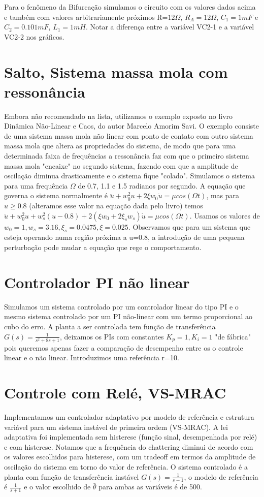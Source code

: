 \documentclass[11pt]{report}
\begin{document}
Para o fenômeno da Bifurcação simulamos o circuito com os valores dados acima e também com valores arbitrariamente próximos R=$12\Omega$, $R_A=12\Omega$, $C_1=1mF$ e $C_2=0.101mF$, $L_1=1mH$. Notar a diferença entre a variável VC2-1 e a variável VC2-2 nos gráficos.


\section{Salto, Sistema massa mola com ressonância}
Embora não recomendado na lista, utilizamos o exemplo exposto no livro Dinâmica Não-Linear e Caos, do autor Marcelo Amorim Savi. O exemplo consiste de uma sistema massa mola não linear com ponto de contato com outro sistema massa mola que altera as propriedades do sistema, de modo que para uma determinada faixa de frequências a ressonância faz com que o primeiro sistema massa mola "encaixe" no segundo sistema, fazendo com que a amplitude de oscilação diminua drasticamente e o sistema fique "colado". Simulamos o sistema para uma frequência $\Omega$ de 0.7, 1.1 e 1.5 radianos por segundo. A equação que governa o sistema normalmente é $\ddot{u} + w_0^2 u + 2\xi w_0 \dot{u} = \mu cos(\Omega t)$, mas para $u \geq 0.8$ (alteramos esse valor na equação dada pelo livro) temos $\ddot{u} + w_0^2 u + w_s^2 (u-0.8) + 2(\xi w_0 +2\xi_s w_s)\dot{u} = \mu cos(\Omega t)$. Usamos os valores de $w_0 = 1, w_s=3.16, \xi_s=0.0475, \xi = 0.025 $. Observamos que para um sistema que esteja operando numa região próxima a u=0.8, a introdução de uma pequena perturbação pode mudar a equação que rege o comportamento. 

\section{Controlador PI não linear}
Simulamos um sistema controlado por um controlador linear do tipo PI e o mesmo sistema controlado por um PI não-linear com um termo proporcional ao cubo do erro. A planta a ser controlada tem função de transferência $G(s)= \frac{1}{s^2+8s+1}$, deixamos os PIs com constantes $K_p=1, K_i=1$ "de fábrica" pois queremos apenas fazer a comparação de desempenho entre os o controle linear e o não linear. Introduzimos uma referência r=10.

\section{Controle com Relé, VS-MRAC}

Implementamos um controlador adaptativo por modelo de referência e estrutura variável para um sistema instável de primeira ordem (VS-MRAC). A lei adaptativa foi implementada sem histerese (função sinal, desempenhada por relé) e com histerese. Notamos que a frequência do chattering diminui de acordo com os valores escolhidos para histerese, com um tradeoff em termos da amplitude de oscilação do sistema em torno do valor de referência. O sistema controlado é a planta com função de transferência instável $G(s) = \frac{1}{s-1}$, o modelo de referência é $\frac{1}{s+1}$ e o valor escolhido de $\bar{\theta}$ para ambas as variáveis é de 500. 
\end{document}
